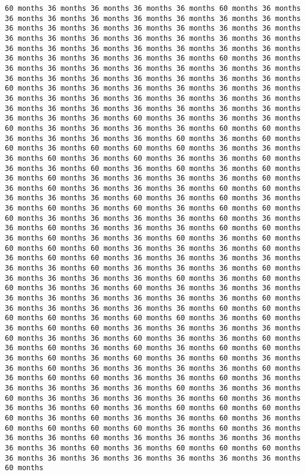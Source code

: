\documentclass[11pt]{article}
\begin{document}
\begin{Verbatim}[commandchars=\\\{\}, frame=single, framerule=2mm, rulecolor=\color{outerrorbackground}]
60 months 36 months 36 months 36 months 36 months 60 months 36 months 36 months 36 months 36 months 36 months 36 months 36 months 36 months 36 months 36 months 36 months 36 months 36 months 36 months 36 months 36 months 36 months 36 months 36 months 36 months 36 months 36 months 36 months 36 months 36 months 36 months 36 months 36 months 36 months 36 months 36 months 36 months 36 months 36 months 60 months 36 months 36 months 36 months 36 months 36 months 36 months 36 months 36 months 36 months 36 months 36 months 36 months 36 months 36 months 36 months 60 months 36 months 36 months 36 months 36 months 36 months 36 months 36 months 36 months 36 months 36 months 36 months 36 months 36 months 36 months 36 months 36 months 36 months 36 months 36 months 36 months 36 months 36 months 36 months 60 months 36 months 36 months 36 months 60 months 36 months 36 months 36 months 36 months 60 months 60 months 36 months 36 months 36 months 36 months 60 months 36 months 60 months 60 months 36 months 60 months 60 months 60 months 36 months 36 months 36 months 60 months 36 months 60 months 36 months 36 months 60 months 36 months 36 months 60 months 36 months 60 months 36 months 60 months 36 months 60 months 36 months 36 months 36 months 36 months 60 months 36 months 60 months 36 months 36 months 36 months 60 months 60 months 36 months 36 months 36 months 60 months 36 months 60 months 36 months 36 months 60 months 36 months 60 months 36 months 60 months 60 months 60 months 36 months 36 months 36 months 36 months 60 months 36 months 36 months 60 months 36 months 36 months 36 months 60 months 60 months 36 months 60 months 36 months 36 months 60 months 36 months 60 months 60 months 60 months 60 months 36 months 36 months 36 months 60 months 36 months 60 months 60 months 36 months 36 months 36 months 36 months 36 months 36 months 60 months 36 months 36 months 36 months 60 months 36 months 36 months 36 months 36 months 60 months 36 months 60 months 60 months 36 months 36 months 60 months 36 months 36 months 36 months 36 months 36 months 36 months 36 months 36 months 36 months 60 months 36 months 36 months 36 months 36 months 36 months 60 months 60 months 60 months 60 months 36 months 60 months 60 months 36 months 60 months 36 months 60 months 60 months 36 months 36 months 36 months 36 months 60 months 36 months 36 months 60 months 36 months 36 months 60 months 36 months 60 months 36 months 60 months 36 months 60 months 60 months 36 months 60 months 36 months 60 months 36 months 60 months 36 months 36 months 60 months 36 months 36 months 36 months 36 months 60 months 36 months 60 months 60 months 36 months 36 months 60 months 36 months 36 months 36 months 36 months 36 months 60 months 36 months 36 months 60 months 36 months 36 months 36 months 36 months 60 months 36 months 36 months 36 months 60 months 36 months 60 months 60 months 60 months 60 months 36 months 60 months 36 months 36 months 60 months 36 months 60 months 60 months 60 months 60 months 36 months 60 months 36 months 36 months 36 months 60 months 36 months 36 months 36 months 36 months 36 months 36 months 60 months 36 months 60 months 60 months 60 months 36 months 36 months 36 months 36 months 36 months 36 months 36 months 60 months 
\end{Verbatim}
\end{document}
